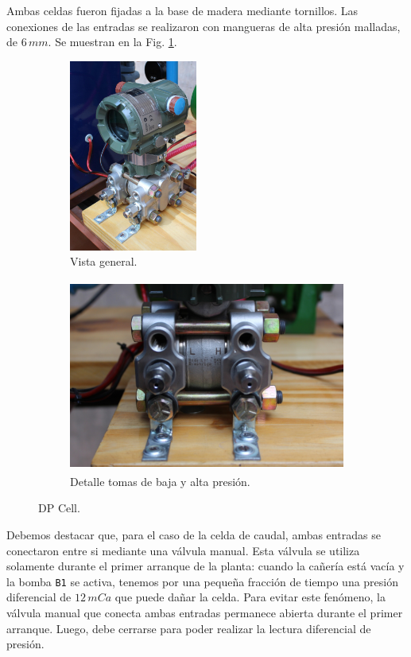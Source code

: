 Ambas celdas fueron fijadas a la base de madera mediante tornillos.
Las conexiones de las entradas se realizaron con mangueras de alta presión
malladas, de $6\,mm$. Se muestran en la Fig. \ref{fig:dpcelfig}.

\begin{figure}[t]
        \centering
        \begin{subfigure}[b]{0.31\textwidth}
        \centering
\includegraphics[height=6.3cm]
	{Cap2-DisenoEnsamblado/images/dpcell1.JPG}
	\caption{Vista general.}
        \end{subfigure}%
        \hfil
        \begin{subfigure}[b]{0.69\textwidth}
        \centering
\includegraphics[height=6.3cm]
	{Cap2-DisenoEnsamblado/images/dpcell2.JPG}
	\caption{Detalle tomas de baja y alta presión.}
        \end{subfigure}
        \caption{DP Cell.}
        \label{fig:dpcelfig}
\end{figure}

Debemos destacar que, para el caso de la celda de caudal, ambas
entradas se conectaron entre si mediante una válvula manual.
Esta válvula se utiliza solamente durante el primer arranque de la planta:
cuando la cañería está vacía y la bomba \verb|B1| se activa, tenemos por una
pequeña
fracción de tiempo una presión diferencial de $12\,mCa$ que puede dañar la
celda.
Para evitar este fenómeno, la válvula manual que conecta ambas entradas
permanece abierta durante el primer arranque.
Luego, debe cerrarse para poder realizar la lectura diferencial de presión.

